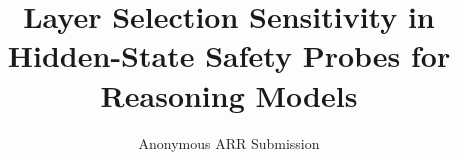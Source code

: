\documentclass[11pt]{article}
\title{Layer Selection Sensitivity in Hidden-State Safety Probes for Reasoning Models}
\author{Anonymous ARR Submission}
\begin{document}
\maketitle

\begin{abstract}

\end{abstract}




















\end{document}
